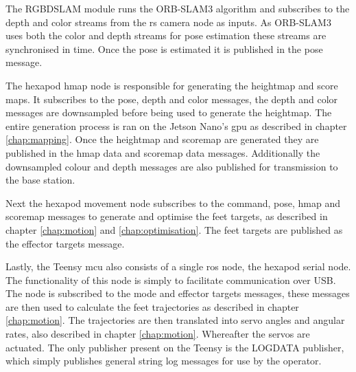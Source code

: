         The RGBDSLAM module runs the ORB-SLAM3 algorithm and subscribes to the depth and color streams from the rs camera node as inputs. As ORB-SLAM3 uses both the color and depth streams for pose estimation these streams are synchronised in time. Once the pose is estimated it is published in the pose message.

        The hexapod hmap node is responsible for generating the heightmap and score maps. It subscribes to the pose, depth and color messages, the depth and color messages are downsampled before being used to generate the heightmap. The entire generation process is ran on the Jetson Nano's \ac{gpu} as described in chapter \ref{chap:mapping}. Once the heightmap and scoremap are generated they are published in the hmap data and scoremap data messages. Additionally the downsampled colour and depth messages are also published for transmission to the base station.

        Next the hexapod movement node subscribes to the command, pose, hmap and scoremap messages to generate and optimise the feet targets, as described in chapter \ref{chap:motion} and \ref{chap:optimisation}. The feet targets are published as the effector targets message.

        Lastly, the Teensy \ac{mcu} also consists of a single \ac{ros} node, the hexapod serial node. The functionality of this node is simply to facilitate communication over USB. The node is subscribed to the mode and effector targets messages, these messages are then used to calculate the feet trajectories as described in chapter \ref{chap:motion}. The trajectories are then translated into servo angles and angular rates, also described in chapter \ref{chap:motion}. Whereafter the servos are actuated. The only publisher present on the Teensy is the LOGDATA publisher, which simply publishes general string log messages for use by the operator.
        
